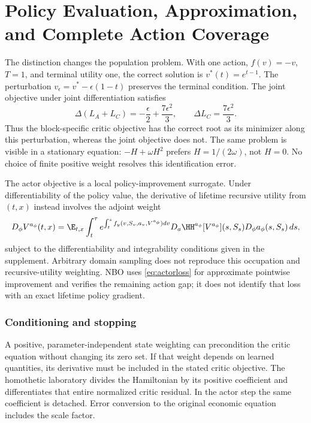 \section{Policy Evaluation, Approximation, and Complete Action Coverage}\label{app:r15evaluation}
The distinction changes the population problem. With one action, $f(v)=-v$, $T=1$, and terminal utility one, the correct solution is $v^*(t)=e^{t-1}$. The perturbation $v_\epsilon=v^*-\epsilon(1-t)$ preserves the terminal condition. The joint objective under joint differentiation satisfies
\begin{equation}\label{eq:counterexample}
 \Delta(L_A+L_C)=-\frac\epsilon2+\frac{7\epsilon^2}{3},
 \qquad \Delta L_C=\frac{7\epsilon^2}{3}.
\end{equation}
Thus the block-specific critic objective has the correct root as its minimizer along this perturbation, whereas the joint objective does not. The same problem is visible in a stationary equation: $-H+\omega H^2$ prefers $H=1/(2\omega)$, not $H=0$. No choice of finite positive weight resolves this identification error.

The actor objective is a local policy-improvement surrogate. Under differentiability of the policy value, the derivative of lifetime recursive utility from $(t,x)$ instead involves the adjoint weight
\begin{equation}\label{eq:gradient}
 D_\phi V^{a_\phi}(t,x)=\E_{t,x}\int_t^\tau
 e^{\int_t^s f_y(v,S_v,a_v,V^{a_\phi})dv}
 D_a\HH^{a_\phi}[V^{a_\phi}](s,S_s)D_\phi a_\phi(s,S_s)\,ds,
\end{equation}
subject to the differentiability and integrability conditions given in the supplement. Arbitrary domain sampling does not reproduce this occupation and recursive-utility weighting. NBO uses \eqref{eq:actorloss} for approximate pointwise improvement and verifies the remaining action gap; it does not identify that loss with an exact lifetime policy gradient.

\subsubsection{Conditioning and stopping}
A positive, parameter-independent state weighting can precondition the critic equation without changing its zero set. If that weight depends on learned quantities, its derivative must be included in the stated critic objective. The homothetic laboratory divides the Hamiltonian by its positive coefficient and differentiates that entire normalized critic residual. In the actor step the same coefficient is detached. Error conversion to the original economic equation includes the scale factor.


